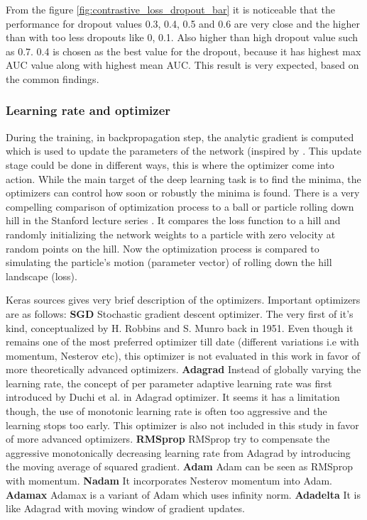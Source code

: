 From the figure \ref{fig:contrastive_loss_dropout_bar} it is noticeable that the performance for dropout values 0.3, 0.4, 0.5 and 0.6 are very close and the higher than with too less dropouts like 0, 0.1. Also higher
than high dropout value such as 0.7. 0.4 is chosen as the best value for the dropout, because it has highest max AUC value along with highest mean AUC. This result is very expected, based on the common findings.

\subsubsection{Learning rate and optimizer}
During the training, in backpropagation step, the analytic gradient is computed which is used to update the parameters of the network (inspired by \cite{ruder}. This update stage could be done in different ways, 
this is where the optimizer come into action. While the main target of the deep learning task is to find the minima, the optimizers can control how soon or robustly the minima is found. There is a very compelling 
comparison of optimization process to a ball or particle rolling down hill in the Stanford lecture series \cite{cs231n}. It compares the loss function to a hill and randomly initializing the network weights to a particle with 
zero velocity at random points on the hill. Now the optimization process is compared to simulating the particle's motion (parameter vector) of rolling down the hill landscape (loss).

Keras sources \cite{kerasopt} gives very brief description of the optimizers. Important optimizers are as follows: \textbf{SGD} Stochastic gradient descent optimizer. The very first of it's kind, conceptualized by H. 
Robbins and S. Munro back in 1951. Even though it remains one of the most preferred optimizer till date 
(different variations i.e with momentum, Nesterov etc), this optimizer is not evaluated in this work in favor of more theoretically advanced optimizers. \textbf{Adagrad} Instead of globally varying the learning rate, 
the concept of per parameter adaptive learning rate was first introduced by Duchi et al. in Adagrad optimizer. It seems it has a limitation though, the use of monotonic learning rate is often too aggressive and the 
learning stops too early. This optimizer is also not included in this study in favor of more advanced optimizers. \textbf{RMSprop} RMSprop try to compensate the aggressive monotonically decreasing learning rate from 
Adagrad by introducing the moving average of squared gradient. \textbf{Adam} Adam can be seen as RMSprop with momentum. \textbf{Nadam} It incorporates Nesterov momentum into Adam. \textbf{Adamax} Adamax is a variant 
of Adam which uses infinity norm. \textbf{Adadelta} It is like Adagrad with moving window of gradient updates.


